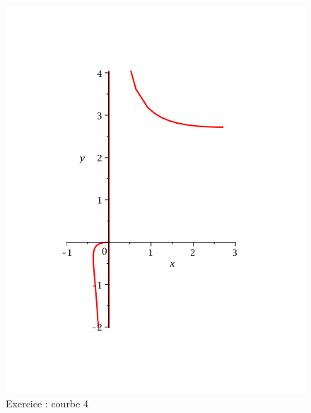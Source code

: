 \begin{figure}[ht]
   \centering
   \includegraphics[scale=0.25]{Ecr01_4.pdf}
   \caption{Exercice  : courbe 4}
\end{figure}
